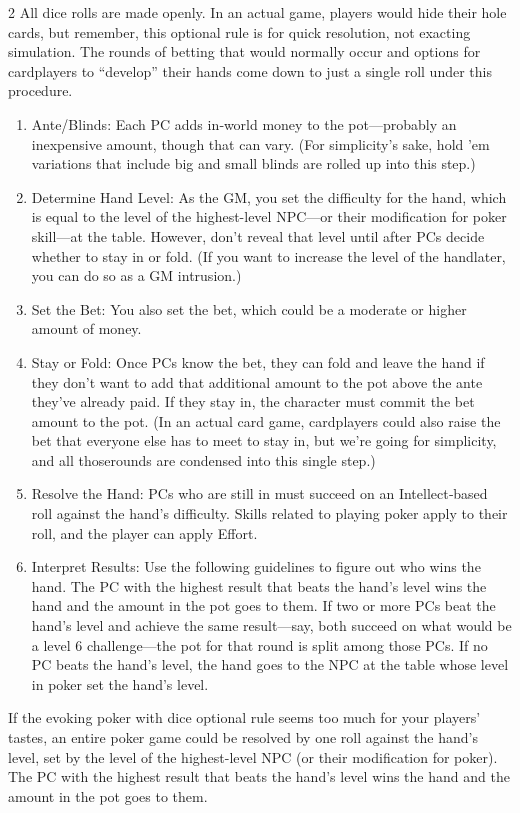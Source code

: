 \begin{multicols}{2}
All dice rolls are made openly. In an actual game, players would hide their hole cards, but remember, this optional rule is for quick resolution, not exacting simulation. The rounds of betting that would normally occur and options for cardplayers to “develop” their hands come down to just a single roll under this procedure.

\begin{enumerate}
\item Ante/Blinds: Each PC adds in‑world money to the pot—probably an inexpensive amount, though that can vary. (For simplicity’s sake, hold ’em variations that include big and small blinds are rolled up into this step.)
\item Determine Hand Level: As the GM, you set the difficulty for the hand, which is equal to the level of the highest-level NPC—or their modification for poker skill—at the table. However, don’t reveal that level until after PCs decide whether to stay in or fold. (If you want to increase the level of the handlater, you can do so as a GM intrusion.)
\item Set the Bet: You also set the bet, which could be a moderate or higher amount of money.
\item Stay or Fold: Once PCs know the bet, they can fold and leave the hand if they don’t want to add that additional amount to the pot above the ante they’ve already paid. If they stay in, the character must commit the bet amount to the pot. (In an actual card game, cardplayers could also raise the bet that everyone else has to meet to stay in, but we’re going for simplicity, and all thoserounds are condensed into this single step.)
\item Resolve the Hand: PCs who are still in must succeed on an Intellect‑based roll against the hand’s difficulty. Skills related to playing poker apply to their roll, and the player can apply Effort.
\item Interpret Results: Use the following guidelines to figure out who wins the hand. The PC with the highest result that beats the hand’s level wins the hand and the amount in the pot goes to them. If two or more PCs beat the hand’s level and achieve the same result—say, both succeed on what would be a level 6 challenge—the pot for that round is split among those PCs. If no PC beats the hand’s level, the hand goes to the NPC at the table whose level in poker set the hand’s level.
\end{enumerate}

If the evoking poker with dice optional rule seems too much for your players’ tastes, an entire poker game could be resolved by one roll against the hand’s level, set by the level of the highest-level NPC (or their modification for poker). The PC with the highest result that beats the hand’s level wins the hand and the amount in the pot goes to them. 


\end{multicols}
